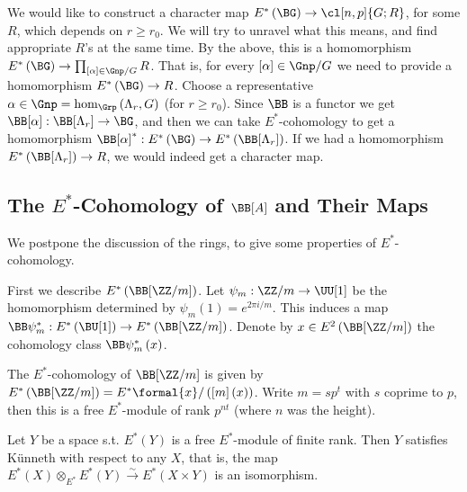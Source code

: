 We would like to construct a character map $E^*\left(\BG\right) \to \cl[n,p]{G; R}$, for some $R$, which depends on $r \geq r_0$.
We will try to unravel what this means, and find appropriate $R$'s at the same time.
By the above, this is a homomorphism $E^*\left(\BG\right) \to \prod_{\left[\alpha\right] \in \Gnp/G} R$.
That is, for every $\left[\alpha\right] \in \Gnp/G$ we need to provide a homomorphism $E^*\left(\BG\right) \to R$.
Choose a representative $\alpha \in \Gnp = \hom_{\Grp}\left(\Lambda_r, G\right)$ (for $r \geq r_0$).
Since $\BB$ is a functor we get $\BB[\alpha]: \BB[\Lambda_r] \to \BG$, and then we can take $E^*$-cohomology to get a homomorphism $\BB[\alpha]^*: E^*\left(\BG\right) \to E^*\left(\BB[\Lambda_r]\right)$.
If we had a homomorphism $E^*\left(\BB[\Lambda_r]\right) \to R$, we would indeed get a character map.



\subsection{The \texorpdfstring{$E^*$}{E*}-Cohomology of \texorpdfstring{$\BB[A]$}{BA} and Their Maps}

We postpone the discussion of the rings, to give some properties of $E^*$-cohomology.

First we describe $E^*\left(\BB[\ZZ/m]\right)$.
Let $\psi_m: \ZZ/m \to \UU[1]$ be the homomorphism determined by $\psi_m\left(1\right) = e^{2\pi i/m}$.
This induces a map $\BB\psi_m^*: E^*\left(\BU[1]\right) \to E^*\left(\BB[\ZZ/m]\right)$.
Denote by $x \in E^2\left(\BB[\ZZ/m]\right)$ the cohomology class $\BB\psi_m^*\left(x\right)$.

\begin{proposition}
	The $E^*$-cohomology of $\BB[\ZZ/m]$ is given by $E^*\left(\BB[\ZZ/m]\right) = E^*\formal{x} / \left(\left[m\right]\left(x\right)\right)$.
	Write $m = sp^t$ with $s$ coprime to $p$, then this is a free $E^*$-module of rank $p^{nt}$ (where $n$ was the height).
\end{proposition}

\begin{proposition}
	Let $Y$ be a space s.t. $E^*\left(Y\right)$ is a free $E^*$-module of finite rank.
	Then $Y$ satisfies K\"unneth with respect to any $X$, that is, the map $E^*\left(X\right) \otimes_{E^*} E^*\left(Y\right) \xrightarrow{\sim} E^*\left(X \times Y\right)$ is an isomorphism.
\end{proposition}


